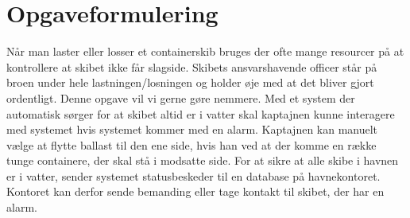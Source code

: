 \chapter{Opgaveformulering}
Når man laster eller losser et containerskib bruges der ofte mange resourcer på at kontrollere at skibet ikke får slagside. Skibets ansvarshavende officer står på broen under hele lastningen/losningen og holder øje med at det bliver gjort ordentligt. Denne opgave vil vi gerne gøre nemmere. Med et system der automatisk sørger for at skibet altid er i vatter skal kaptajnen kunne interagere med systemet hvis systemet kommer med en alarm. Kaptajnen kan manuelt vælge at flytte ballast til den ene side, hvis han ved at der komme en række tunge containere, der skal stå i modsatte side. For at sikre at alle skibe i havnen er i vatter, sender systemet statusbeskeder til en database på havnekontoret. Kontoret kan derfor sende bemanding eller tage kontakt til skibet, der har en alarm.